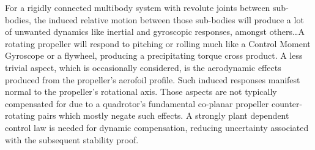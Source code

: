 \par
For a rigidly connected multibody system with revolute joints between sub-bodies, the induced relative motion between those sub-bodies will produce a lot of unwanted dynamics like inertial and gyroscopic responses, amongst others\ldots A rotating propeller will respond to pitching or rolling much like a Control Moment Gyroscope \cite{cmg} or a flywheel, producing a precipitating torque cross product. A less trivial aspect, which is occasionally considered, is the aerodynamic effects produced from the propeller's aerofoil profile. Such induced responses manifest normal to the propeller's rotational axis. Those aspects are not typically compensated for due to a quadrotor's fundamental co-planar propeller counter-rotating pairs which mostly negate such effects. A strongly plant dependent control law is needed for dynamic compensation, reducing uncertainty associated with the subsequent stability proof. 
